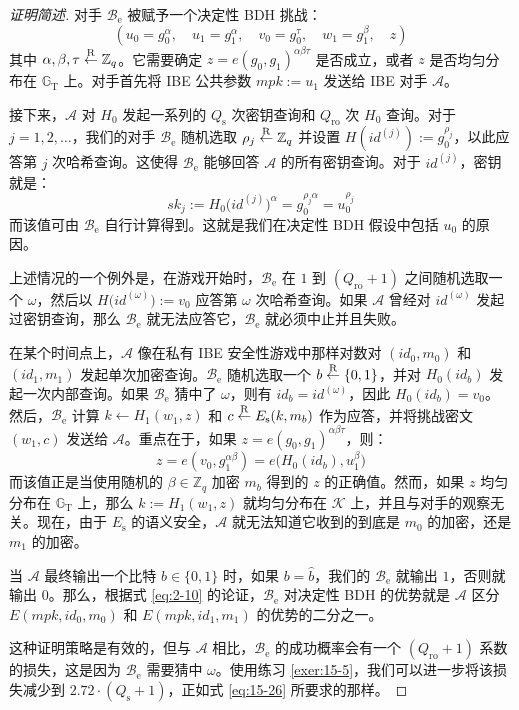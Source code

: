 \begin{proof}[证明简述]
对手 $\mathcal{B}_\mathrm{e}$ 被赋予一个决定性 BDH 挑战：
\[
(u_0=g_0^\alpha,\quad u_1=g_1^\alpha,\quad v_0=g_0^\tau,\quad w_1=g_1^\beta,\quad z)
\]
其中 $\alpha,\beta,\tau\overset{\rm R}\leftarrow\mathbb{Z}_q$。它需要确定 $z=e(g_0,g_1)^{\alpha\beta\tau}$ 是否成立，或者 $z$ 是否均匀分布在 $\mathbb{G}_\mathrm{T}$ 上。对手首先将 IBE 公共参数 $\mathit{mpk}:=u_1$ 发送给 IBE 对手 $\mathcal{A}$。

接下来，$\mathcal{A}$ 对 $H_0$ 发起一系列的 $Q_\mathrm{s}$ 次密钥查询和 $Q_\mathrm{ro}$ 次 $H_0$ 查询。对于 $j=1,2,\dots$，我们的对手 $\mathcal{B}_\mathrm{e}$ 随机选取 $\rho_j\overset{\rm R}\leftarrow\mathbb{Z}_q$ 并设置 $H(\mathit{id}^{(j)}):=g_0^{\rho_j}$，以此应答第 $j$ 次哈希查询。这使得 $\mathcal{B}_\mathrm{e}$ 能够回答 $\mathcal{A}$ 的所有密钥查询。对于 $\mathit{id}^{(j)}$，密钥就是：
\[
\mathit{sk}_j:=H_0\big(\mathit{id}^{(j)}\big)^\alpha=g_0^{\rho_j\alpha}=u_0^{\rho_j}
\]
而该值可由 $\mathcal{B}_\mathrm{e}$ 自行计算得到。这就是我们在决定性 BDH 假设中包括 $u_0$ 的原因。

上述情况的一个例外是，在游戏开始时，$\mathcal{B}_\mathrm{e}$ 在 $1$ 到 $(Q_\mathrm{ro}+1)$ 之间随机选取一个 $\omega$，然后以 $H\big(\mathit{id}^{(\omega)}\big):=v_0$ 应答第 $\omega$ 次哈希查询。如果 $\mathcal{A}$ 曾经对 $\mathit{id}^{(\omega)}$ 发起过密钥查询，那么 $\mathcal{B}_\mathrm{e}$ 就无法应答它，$\mathcal{B}_\mathrm{e}$ 就必须中止并且失败。

在某个时间点上，$\mathcal{A}$ 像在私有 IBE 安全性游戏中那样对数对 $(\mathit{id}_0,m_0)$ 和 $(\mathit{id}_1,m_1)$ 发起单次加密查询。$\mathcal{B}_\mathrm{e}$ 随机选取一个 $b\overset{\rm R}\leftarrow\{0,1\}$，并对 $H_0(\mathit{id}_b)$ 发起一次内部查询。如果 $\mathcal{B}_\mathrm{e}$ 猜中了 $\omega$，则有 $\mathit{id}_b=\mathit{id}^{(\omega)}$，因此 $H_0(\mathit{id}_b)=v_0$。然后，$\mathcal{B}_\mathrm{e}$ 计算 $k\leftarrow H_1(w_1,z)$ 和 $c\overset{\rm R}\leftarrow E_\mathrm{s}(k,m_b)$ 作为应答，并将挑战密文 $(w_1,c)$ 发送给 $\mathcal{A}$。重点在于，如果 $z=e(g_0,g_1)^{\alpha\beta\tau}$，则：
\[
z=e(v_0,g_1^{\alpha\beta})
=e\big(H_0(\mathit{id}_b),u_1^\beta\big)
\]
而该值正是当使用随机的 $\beta\in\mathbb{Z}_q$ 加密 $m_b$ 得到的 $z$ 的正确值。然而，如果 $z$ 均匀分布在 $\mathbb{G}_\mathrm{T}$ 上，那么 $k:=H_1(w_1,z)$ 就均匀分布在 $\mathcal{K}$ 上，并且与对手的观察无关。现在，由于 $E_\mathrm{s}$ 的语义安全，$\mathcal{A}$ 就无法知道它收到的到底是 $m_0$ 的加密，还是 $m_1$ 的加密。

当 $\mathcal{A}$ 最终输出一个比特 $\hat{b}\in\{0,1\}$ 时，如果 $b=\hat{b}$，我们的 $\mathcal{B}_\mathrm{e}$ 就输出 $1$，否则就输出 $0$。那么，根据式 \ref{eq:2-10} 的论证，$\mathcal{B}_\mathrm{e}$ 对决定性 BDH 的优势就是 $\mathcal{A}$ 区分 $E(\mathit{mpk},\mathit{id}_0,m_0)$ 和 $E(\mathit{mpk},\mathit{id}_1,m_1)$ 的优势的二分之一。

这种证明策略是有效的，但与 $\mathcal{A}$ 相比，$\mathcal{B}_\mathrm{e}$ 的成功概率会有一个 $(Q_\mathrm{ro}+1)$ 系数的损失，这是因为 $\mathcal{B}_\mathrm{e}$ 需要猜中 $\omega$。使用练习 \ref{exer:15-5}，我们可以进一步将该损失减少到 $2.72\cdot(Q_\mathrm{s}+1)$，正如式 \ref{eq:15-26} 所要求的那样。
\end{proof}

